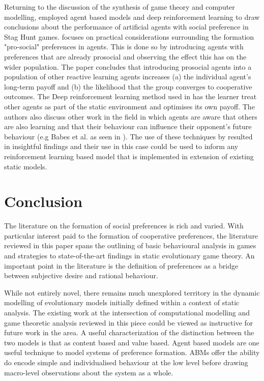 \documentclass[11pt]{article}
\newcommand{\todo}[1]{\textcolor{red}{[TODO: #1]}\PackageWarning{TODO:}{#1!}}
\newcommand*{\np}{\par\noindent\newline}
\begin{document}
\np Returning to the discussion of the synthesis of game theory and computer modelling, \citet{peysakhovich_prosocial_2017} employed agent based models and deep reinforcement learning to draw conclusions about the
performance of artificial agents with social preference in Stag Hunt games. \citet{peysakhovich_prosocial_2017} focuses
on practical considerations surrounding the formation "pro-social" preferences in agents. This is done so by introducing
agents with preferences that are already prosocial and observing the effect this has on the wider population. The paper
concludes that introducing prosocial agents into a population of other reactive learning agents increases (a) the
individual agent's long-term payoff and (b) the likelihood that the group converges to cooperative outcomes.
The Deep reinforcement learning method used in \citet{peysakhovich_prosocial_2017} has the learner treat other agents as
part of the static environment and optimises its own payoff. The authors also discuss other work in the field in which
agents are aware that others are also learning and that their behaviour can influence their opponent's future behaviour
(e.g Babes et al. as seen in \citealt{peysakhovich_prosocial_2017}). The use of these techniques by 
\citet{peysakhovich_prosocial_2017} resulted in insightful findings and their use in this case could be used to inform any reinforcement learning based model that is implemented in extension of existing static models.



\section{Conclusion}\label{conc}
The literature on the formation of social preferences is rich and varied. With particular interest paid to the formation
of cooperative preferences, the literature reviewed in this paper spans the outlining of basic behavioural analysis in
games and strategies to state-of-the-art findings in static evolutionary game theory. An important point in the
literature is the definition of preferences as a bridge between subjective desire and rational behaviour. 

\np While not entirely novel, there remains much unexplored territory in the dynamic modelling of evolutionary models
initially defined within a context of static analysis. The existing work at the intersection of computational modelling
and game theoretic analysis reviewed in this piece could be viewed as instructive for future work in the area. A useful
characterization of the distinction between the two models is that as content based and value based. Agent based models
are one useful technique to model systems of preference formation. ABMs offer the ability do encode simple and
individualised behaviour at the low level before drawing macro-level observations about the system as a whole.
\end{document}
